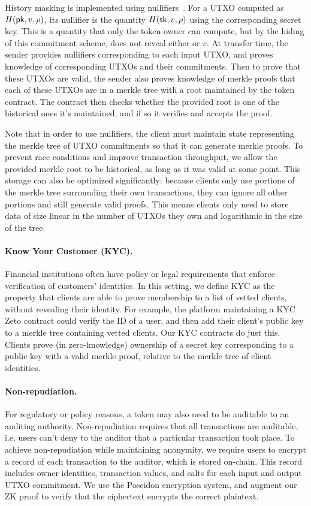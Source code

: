 History masking is implemented using nullifiers~\cite{TODO}. For a UTXO computed as $H(\mathsf{pk}, v, \rho)$, its nullifier is the quantity $H(\mathsf{sk}, v, \rho)$ using the corresponding secret key. This is a quantity that only the token owner can compute, but by the hiding of this commitment scheme, does not reveal either \sk or $v$. At transfer time, the sender provides nullifiers corresponding to each input UTXO, and proves knowledge of corresponding UTXOs and their commitments. Then to prove that these UTXOs are valid, the sender also proves knowledge of merkle proofs that each of these UTXOs are in a merkle tree with a root maintained by the token contract. The contract then checks whether the provided root is one of the historical ones it's maintained, and if so it verifies and accepts the proof.

Note that in order to use nullifiers, the client must maintain state representing the merkle tree of UTXO commitments so that it can generate merkle proofs. To prevent race conditions and improve transaction throughput, we allow the provided merkle root to be historical, as long as it was valid at some point. This storage can also be optimized significantly: because clients only use portions of the merkle tree surrounding their own transactions, they can ignore all other portions and still generate valid proofs. This means clients only need to store data of size linear in the number of UTXOs they own and logarithmic in the size of the tree.

\paragraph{Know Your Customer (KYC).} Financial institutions often have policy or legal requirements that enforce verification of customers' identities. In this setting, we define KYC as the property that clients are able to prove membership to a list of vetted clients, without revealing their identity. For example, the platform maintaining a KYC Zeto contract could verify the ID of a user, and then add their client's public key to a merkle tree containing vetted clients. Our KYC contracts do just this. Clients prove (in zero-knowledge) ownership of a secret key corresponding to a public key with a valid merkle proof, relative to the merkle tree of client identities.

\paragraph{Non-repudiation.} For regulatory or policy reasons, a token may also need to be auditable to an auditing authority. Non-repudiation requires that all transactions are auditable, i.e. users can't deny to the auditor that a particular transaction took place. To achieve non-repudiation while maintaining anonymity, we require users to encrypt a record of each transaction to the auditor, which is stored on-chain. This record includes owner identities, transaction values, and salts for each input and output UTXO commitment. We use the Poseidon encryption system, and augment our ZK proof to verify that the ciphertext encrypts the correct plaintext.

